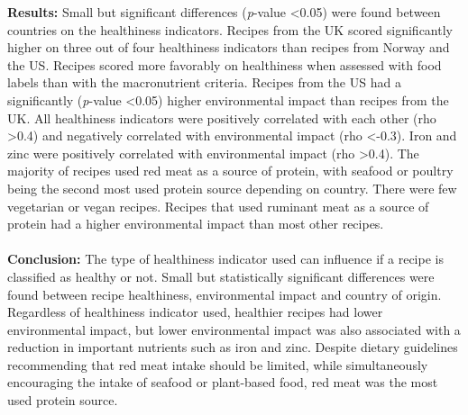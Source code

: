 \textbf{Results:} Small but significant differences (\emph{p}-value <0.05) were found between countries on the healthiness indicators. Recipes from the UK scored significantly higher on three out of four healthiness indicators than recipes from Norway and the US. Recipes scored more favorably on healthiness when assessed with food labels than with the macronutrient criteria. Recipes from the US had a significantly (\emph{p}-value <0.05) higher environmental impact than recipes from the UK. All healthiness indicators were positively correlated with each other (rho >0.4) and negatively correlated with environmental impact (rho <-0.3). Iron and zinc were positively correlated with environmental impact (rho >0.4). The majority of recipes used red meat as a source of protein, with seafood or poultry being the second most used protein source depending on country. There were few vegetarian or vegan recipes. Recipes that used ruminant meat as a source of protein had a higher environmental impact than most other recipes.\\\\
\textbf{Conclusion:} The type of healthiness indicator used can influence if a recipe is classified as healthy or not. Small but statistically significant differences were found between recipe healthiness, environmental impact and country of origin. Regardless of healthiness indicator used, healthier recipes had lower environmental impact, but lower environmental impact was also associated with a reduction in important nutrients such as iron and zinc. Despite dietary guidelines recommending that red meat intake should be limited, while simultaneously encouraging the intake of seafood or plant-based food, red meat was the most used protein source.
\pagebreak
